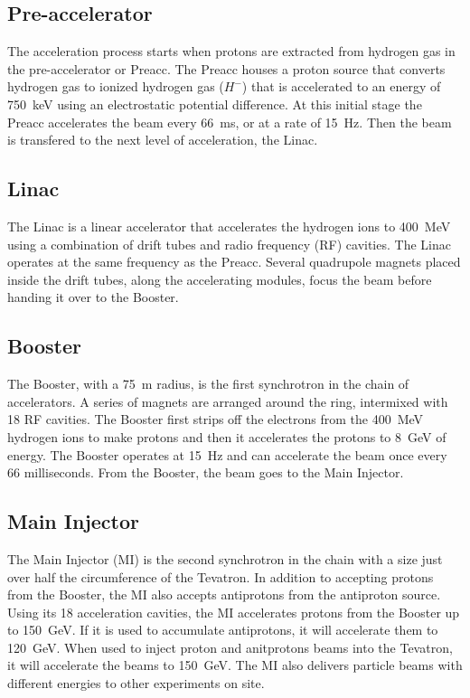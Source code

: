 \subsection{Pre-accelerator}
The acceleration process starts when protons are extracted from hydrogen gas in the pre-accelerator or Preacc. The Preacc houses a proton source that converts hydrogen gas to ionized hydrogen gas ($H^{-}$) that is accelerated to an energy of \mbox{750 keV} using an electrostatic potential difference. At this initial stage the Preacc accelerates the beam every \mbox{66 ms}, or at a rate of \mbox{15 Hz}. Then the beam is transfered to the next level of acceleration, the Linac.

\subsection{Linac}
The Linac is a linear accelerator that accelerates the hydrogen ions to \mbox{400 MeV} using a combination of drift tubes and radio frequency (RF) cavities. The Linac operates at the same frequency as the Preacc. Several quadrupole magnets placed inside the drift tubes, along the accelerating modules, focus the beam before handing it over to the Booster.

\subsection{Booster}
The Booster, with a \mbox{75 m} radius, is the first synchrotron in the chain of accelerators. A series of magnets are arranged around the ring, intermixed with 18 RF cavities. The Booster first strips off the electrons from the 400~MeV hydrogen ions to make protons and then it accelerates the protons to \mbox{8 GeV} of energy. The Booster operates at \mbox{15 Hz} and can accelerate the beam once every 66 milliseconds. From the Booster, the beam goes to the Main Injector.

\subsection{Main Injector}
The Main Injector (MI) is the second synchrotron in the chain with a size just over half the circumference of the Tevatron. In addition to accepting protons from the Booster, the MI also accepts antiprotons from the antiproton source. Using its 18 acceleration cavities, the MI accelerates protons from the Booster up to \mbox{150 GeV}. If it is used to accumulate antiprotons, it will accelerate them to \mbox{120 GeV}. When used to inject proton and anitprotons beams into the Tevatron, it will accelerate the beams to \mbox{150 GeV}. The MI also delivers particle beams with different energies to other experiments on site.

